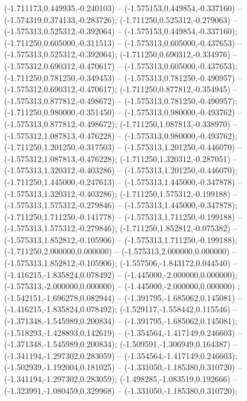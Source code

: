 (-1.711173,0.449935,-0.240103) -- (-1.575153,0.449854,-0.337160) -- (-1.574319,0.374133,-0.283726);
 (-1.711250,0.525312,-0.279063) -- (-1.575313,0.525312,-0.392064) -- (-1.575153,0.449854,-0.337160);
 (-1.711250,0.605000,-0.311513) -- (-1.575313,0.605000,-0.437653) -- (-1.575313,0.525312,-0.392064);
 (-1.711250,0.690312,-0.334976) -- (-1.575312,0.690312,-0.470617) -- (-1.575313,0.605000,-0.437653);
 (-1.711250,0.781250,-0.349453) -- (-1.575313,0.781250,-0.490957) -- (-1.575312,0.690312,-0.470617);
 (-1.711250,0.877812,-0.354945) -- (-1.575313,0.877812,-0.498672) -- (-1.575313,0.781250,-0.490957);
 (-1.711250,0.980000,-0.351450) -- (-1.575313,0.980000,-0.493762) -- (-1.575313,0.877812,-0.498672);
 (-1.711250,1.087813,-0.338970) -- (-1.575312,1.087813,-0.476228) -- (-1.575313,0.980000,-0.493762);
 (-1.711250,1.201250,-0.317503) -- (-1.575313,1.201250,-0.446070) -- (-1.575312,1.087813,-0.476228);
 (-1.711250,1.320312,-0.287051) -- (-1.575313,1.320312,-0.403286) -- (-1.575313,1.201250,-0.446070);
 (-1.711250,1.445000,-0.247613) -- (-1.575313,1.445000,-0.347878) -- (-1.575313,1.320312,-0.403286);
 (-1.711250,1.575312,-0.199188) -- (-1.575313,1.575312,-0.279846) -- (-1.575313,1.445000,-0.347878);
 (-1.711250,1.711250,-0.141778) -- (-1.575313,1.711250,-0.199188) -- (-1.575313,1.575312,-0.279846);
 (-1.711250,1.852812,-0.075382) -- (-1.575313,1.852812,-0.105906) -- (-1.575313,1.711250,-0.199188);
 (-1.711250,2.000000,0.000000) -- (-1.575313,2.000000,0.000000) -- (-1.575313,1.852812,-0.105906);
 (-1.557506,-1.843172,0.044540) -- (-1.416215,-1.835824,0.078492) -- (-1.445000,-2.000000,0.000000);
 (-1.575313,-2.000000,0.000000) -- (-1.445000,-2.000000,0.000000) ;
 (-1.542151,-1.696278,0.082944) -- (-1.391795,-1.685062,0.145081) -- (-1.416215,-1.835824,0.078492);
 (-1.529117,-1.558442,0.115546) -- (-1.371348,-1.545989,0.200834) -- (-1.391795,-1.685062,0.145081);
 (-1.518293,-1.428893,0.142619) -- (-1.354564,-1.417149,0.246603) -- (-1.371348,-1.545989,0.200834);
 (-1.509591,-1.306949,0.164387) -- (-1.341194,-1.297302,0.283059) -- (-1.354564,-1.417149,0.246603);
 (-1.502939,-1.192004,0.181025) -- (-1.331050,-1.185380,0.310720) -- (-1.341194,-1.297302,0.283059);
 (-1.498285,-1.083519,0.192666) -- (-1.323991,-1.080459,0.329968) -- (-1.331050,-1.185380,0.310720);
